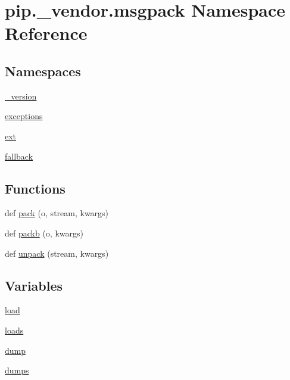 \hypertarget{namespacepip_1_1__vendor_1_1msgpack}{}\section{pip.\+\_\+vendor.\+msgpack Namespace Reference}
\label{namespacepip_1_1__vendor_1_1msgpack}
\subsection*{Namespaces}
\begin{DoxyCompactItemize}
\item 
 \hyperlink{namespacepip_1_1__vendor_1_1msgpack_1_1__version}{\+\_\+version}
\item 
 \hyperlink{namespacepip_1_1__vendor_1_1msgpack_1_1exceptions}{exceptions}
\item 
 \hyperlink{namespacepip_1_1__vendor_1_1msgpack_1_1ext}{ext}
\item 
 \hyperlink{namespacepip_1_1__vendor_1_1msgpack_1_1fallback}{fallback}
\end{DoxyCompactItemize}
\subsection*{Functions}
\begin{DoxyCompactItemize}
\item 
def \hyperlink{namespacepip_1_1__vendor_1_1msgpack_a18894bccffe8100e5b40292e084b3f70}{pack} (o, stream, kwargs)
\item 
def \hyperlink{namespacepip_1_1__vendor_1_1msgpack_a185e16c7e8d0315d9646129bfdae88de}{packb} (o, kwargs)
\item 
def \hyperlink{namespacepip_1_1__vendor_1_1msgpack_ae5f486d414a6a00cec8c347726fffc42}{unpack} (stream, kwargs)
\end{DoxyCompactItemize}
\subsection*{Variables}
\begin{DoxyCompactItemize}
\item 
\hyperlink{namespacepip_1_1__vendor_1_1msgpack_a6ce1816b284764aeb33c6ed0fd8857b3}{load}
\item 
\hyperlink{namespacepip_1_1__vendor_1_1msgpack_a67b344a39036e8a7883ec7d61c3dd0c1}{loads}
\item 
\hyperlink{namespacepip_1_1__vendor_1_1msgpack_adb13434b0aa273b58ce5b8d2a019a210}{dump}
\item 
\hyperlink{namespacepip_1_1__vendor_1_1msgpack_ab14e35db24a6dc2eaf4e8279a1331953}{dumps}
\end{DoxyCompactItemize}



